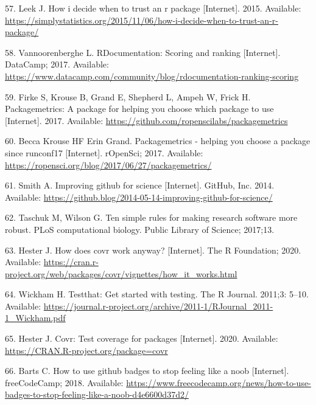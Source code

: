 \documentclass[10pt,letterpaper]{article}
\begin{document}
\leavevmode\hypertarget{ref-leek2015}{}%
57. Leek J. How i decide when to trust an r package {[}Internet{]}.
2015. Available:
\url{https://simplystatistics.org/2015/11/06/how-i-decide-when-to-trust-an-r-package/}

\leavevmode\hypertarget{ref-vannoorenberghe2017}{}%
58. Vannoorenberghe L. RDocumentation: Scoring and ranking
{[}Internet{]}. DataCamp; 2017. Available:
\url{https://www.datacamp.com/community/blog/rdocumentation-ranking-scoring}

\leavevmode\hypertarget{ref-packagemetrics}{}%
59. Firke S, Krouse B, Grand E, Shepherd L, Ampeh W, Frick H.
Packagemetrics: A package for helping you choose which package to use
{[}Internet{]}. 2017. Available:
\url{https://github.com/ropenscilabs/packagemetrics}

\leavevmode\hypertarget{ref-packagemetricsblog}{}%
60. Becca Krouse HF Erin Grand. Packagemetrics - helping you choose a
package since runconf17 {[}Internet{]}. rOpenSci; 2017. Available:
\url{https://ropensci.org/blog/2017/06/27/packagemetrics/}

\leavevmode\hypertarget{ref-smith2014}{}%
61. Smith A. Improving github for science {[}Internet{]}. GitHub, Inc.
2014. Available:
\url{https://github.blog/2014-05-14-improving-github-for-science/}

\leavevmode\hypertarget{ref-taschuk2017}{}%
62. Taschuk M, Wilson G. Ten simple rules for making research software
more robust. PLoS computational biology. Public Library of Science;
2017;13.

\leavevmode\hypertarget{ref-hester2020}{}%
63. Hester J. How does covr work anyway? {[}Internet{]}. The R
Foundation; 2020. Available:
\url{https://cran.r-project.org/web/packages/covr/vignettes/how_it_works.html}

\leavevmode\hypertarget{ref-wickham2011}{}%
64. Wickham H. Testthat: Get started with testing. The R Journal.
2011;3: 5--10. Available:
\url{https://journal.r-project.org/archive/2011-1/RJournal_2011-1_Wickham.pdf}

\leavevmode\hypertarget{ref-covr}{}%
65. Hester J. Covr: Test coverage for packages {[}Internet{]}. 2020.
Available: \url{https://CRAN.R-project.org/package=covr}

\leavevmode\hypertarget{ref-barts2018}{}%
66. Barts C. How to use github badges to stop feeling like a noob
{[}Internet{]}. freeCodeCamp; 2018. Available:
\url{https://www.freecodecamp.org/news/how-to-use-badges-to-stop-feeling-like-a-noob-d4e6600d37d2/}
\end{document}
